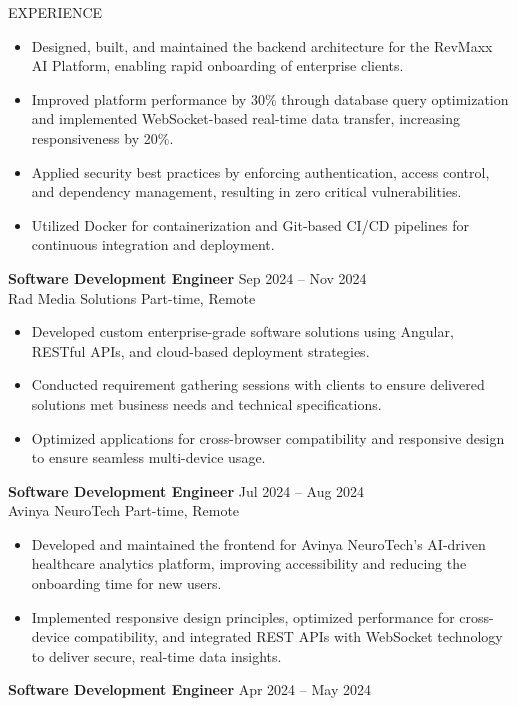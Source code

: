 \documentclass{resume}
\begin{document}
\begin{rSection}{EXPERIENCE}
	\vspace{-0.4em}
	\begin{itemize}
		\item{Designed, built, and maintained the backend architecture for the RevMaxx AI Platform, enabling rapid onboarding of enterprise clients.}
		\item{Improved platform performance by 30\% through database query optimization and implemented WebSocket-based real-time data transfer, increasing responsiveness by 20\%.}
		\item{Applied security best practices by enforcing authentication, access control, and dependency management, resulting in zero critical vulnerabilities.}
		\item{Utilized Docker for containerization and Git-based CI/CD pipelines for continuous integration and deployment.}
	\end{itemize}
	{\bf Software Development Engineer} \hfill {Sep 2024 -- Nov 2024}\\
	Rad Media Solutions \hfill {Part-time, Remote}
	\vspace{-0.4em}
	\begin{itemize}
		\item{Developed custom enterprise-grade software solutions using Angular, RESTful APIs, and cloud-based deployment strategies.}
		\item{Conducted requirement gathering sessions with clients to ensure delivered solutions met business needs and technical specifications.}
		\item{Optimized applications for cross-browser compatibility and responsive design to ensure seamless multi-device usage.}
	\end{itemize}
	{\bf Software Development Engineer} \hfill {Jul 2024 -- Aug 2024}\\
	Avinya NeuroTech \hfill {Part-time, Remote}
	\vspace{-0.4em}
	\begin{itemize}
		\item{Developed and maintained the frontend for Avinya NeuroTech’s AI-driven healthcare analytics platform, improving accessibility and reducing the onboarding time for new users.}
		\item{Implemented responsive design principles, optimized performance for cross-device compatibility, and integrated REST APIs with WebSocket technology to deliver secure, real-time data insights.}
	\end{itemize}
	{\bf Software Development Engineer} \hfill {Apr 2024 -- May 2024}\\

\end{rSection}
\end{document}
